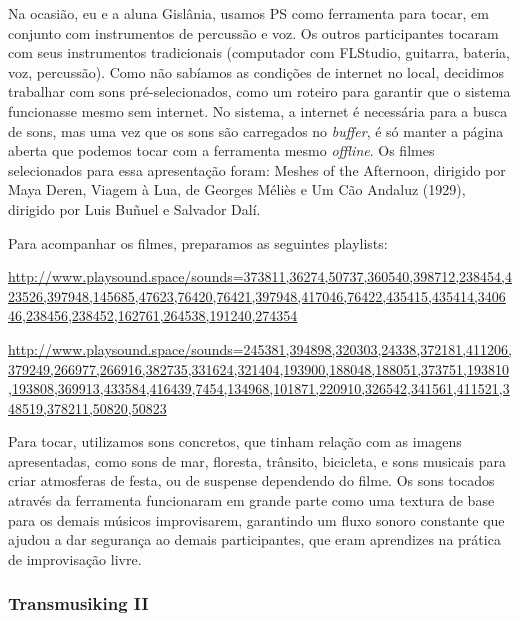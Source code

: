 Na ocasião, eu e a aluna Gislânia, usamos PS como ferramenta para tocar, em conjunto com instrumentos de percussão e voz. Os outros participantes tocaram com seus instrumentos tradicionais (computador com FLStudio, guitarra, bateria, voz, percussão). Como não sabíamos as condições de internet no local, decidimos trabalhar com sons pré-selecionados, como um roteiro para garantir que o sistema funcionasse mesmo sem internet. No sistema, a internet é necessária para a busca de sons, mas uma vez que os sons são carregados no \emph{buffer}, é só manter a página aberta que podemos tocar com a ferramenta mesmo \emph{offline}. Os filmes selecionados para essa apresentação foram:  Meshes of the Afternoon, dirigido por Maya Deren, Viagem à Lua, de Georges Méliès e Um Cão Andaluz (1929), dirigido por Luis Buñuel e Salvador Dalí. 

Para acompanhar os filmes, preparamos as seguintes playlists: 

\url{http://www.playsound.space/sounds=373811,36274,50737,360540,398712,238454,423526,397948,145685,47623,76420,76421,397948,417046,76422,435415,435414,340646,238456,238452,162761,264538,191240,274354}

\url{http://www.playsound.space/sounds=245381,394898,320303,24338,372181,411206,379249,266977,266916,382735,331624,321404,193900,188048,188051,373751,193810,193808,369913,433584,416439,7454,134968,101871,220910,326542,341561,411521,348519,378211,50820,50823}

Para tocar, utilizamos sons concretos, que tinham relação com as imagens apresentadas, como sons de mar, floresta, trânsito, bicicleta, e sons musicais para criar atmosferas de festa, ou de suspense dependendo do filme. Os sons tocados através da ferramenta funcionaram em grande parte como uma textura de base para os demais músicos improvisarem, garantindo um fluxo sonoro constante que ajudou a dar segurança ao demais participantes, que eram aprendizes na prática de improvisação livre.





\subsubsection{Transmusiking II}

